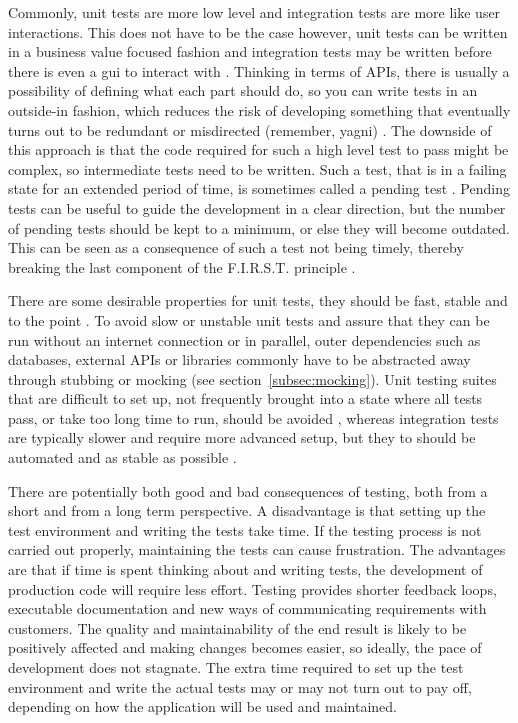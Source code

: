 \documentclass[11pt]{article}
\begin{document}
Commonly, unit tests are more low level and integration tests are more like user interactions. This does not have to be the case however, unit tests can be written in a business value focused fashion and integration tests may be written before there is even a \gls{gui} to interact with \cite[question~20]{Ahnve}. Thinking in terms of APIs, there is usually a possibility of defining what each part should do, so you can write tests in an outside-in fashion, which reduces the risk of developing something that eventually turns out to be redundant or misdirected (remember, \gls{yagni}) \cite[question~29]{Ahnve}. The downside of this approach is that the code required for such a high level test to pass might be complex, so intermediate tests need to be written. Such a test, that is in a failing state for an extended period of time, is sometimes called a pending test \cite[question~31]{Ahnve}. Pending tests can be useful to guide the development in a clear direction, but the number of pending tests should be kept to a minimum, or else they will become outdated. This can be seen as a consequence of such a test not being timely, thereby breaking the last component of the F.I.R.S.T. principle \cite[p.~132-133]{Clean}.

There are some desirable properties for unit tests, they should be fast, stable and to the point \cite[questions~16-18]{Ahnve}\cite[mail conversation]{Stenmark}\cite[question~12]{Ekelof}. To avoid slow or unstable unit tests and assure that they can be run without an internet connection or in parallel, outer dependencies such as databases, external APIs or libraries commonly have to be abstracted away through stubbing or mocking (see section~\ref{subsec:mocking}). Unit testing suites that are difficult to set up, not frequently brought into a state where all tests pass, or take too long time to run, should be avoided \cite[question~36]{Ahnve}\cite[question~2]{Rovegard}\cite[questions~21-22]{Stenmark}, whereas integration tests are typically slower and require more advanced setup, but they to should be automated and as stable as possible \cite[question~37]{Stenmark}.

There are potentially both good and bad consequences of testing, both from a short and from a long term perspective. A disadvantage is that setting up the test environment and writing the tests take time. If the testing process is not carried out properly, maintaining the tests can cause frustration. The advantages are that if time is spent thinking about and writing tests, the development of production code will require less effort. Testing provides shorter feedback loops, executable documentation and new ways of communicating requirements with customers. The quality and maintainability of the end result is likely to be positively affected and making changes becomes easier, so ideally, the pace of development does not stagnate. The extra time required to set up the test environment and write the actual tests may or may not turn out to pay off, depending on how the application will be used and maintained.
\end{document}
